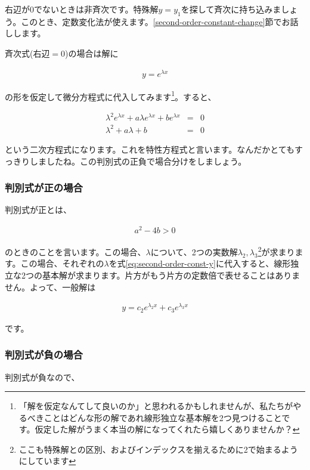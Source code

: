 右辺が0でないときは非斉次です。特殊解$y=y_1$を探して斉次に持ち込みましょう。このとき、定数変化法が使えます。\ref{second-order-constant-change}節でお話しします。

斉次式(右辺$=0$)の場合は解に

\begin{eqnarray}
    y=e^{\lambda x}
    \label{eq:second-order-const-y}
\end{eqnarray}

\noindent
の形を仮定して微分方程式に代入してみます\footnote{「解を仮定なんてして良いのか」と思われるかもしれませんが、私たちがやるべきことはどんな形の解であれ線形独立な基本解を2つ見つけることです。仮定した解がうまく本当の解になってくれたら嬉しくありませんか？}。すると、

\begin{eqnarray}
    \lambda^2e^{\lambda x}+a\lambda e^{\lambda x}+be^{\lambda x}&=&0 \\
    \lambda^2+a\lambda+b&=&0
    \label{eq:second-order-lambda}
\end{eqnarray}

\noindent
という二次方程式になります。これを特性方程式と言います。なんだかとてもすっきりしましたね。この判別式の正負で場合分けをしましょう。



\subsubsection{判別式が正の場合}
判別式が正とは、

\begin{eqnarray}
    a^2-4b>0
\end{eqnarray}

\noindent
のときのことを言います。この場合、$\lambda$について、2つの実数解$\lambda_2, \lambda_3$\footnote{ここも特殊解との区別、およびインデックスを揃えるために2で始まるようにしています}が求まります。この場合、それぞれの$\lambda$を式\ref{eq:second-order-const-y}に代入すると、線形独立な2つの基本解が求まります。片方がもう片方の定数倍で表せることはありません。よって、一般解は

\begin{eqnarray}
    y=c_2e^{\lambda_2x}+c_3e^{\lambda_3x}
\end{eqnarray}

\noindent
です。

\subsubsection{判別式が負の場合}
判別式が負なので、

